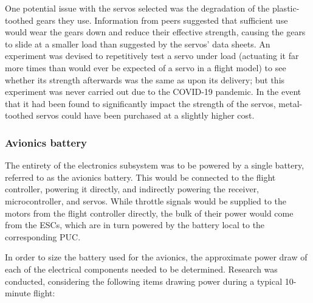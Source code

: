 \documentclass[../../main.tex]{subfiles}
\begin{document}
One potential issue with the servos selected was the degradation of the plastic-toothed gears they use.
Information from peers suggested that sufficient use would wear the gears down and reduce their effective strength, causing the gears to slide at a smaller load than suggested by the servos' data sheets.
An experiment was devised to repetitively test a servo under load (actuating it far more times than would ever be expected of a servo in a flight model) to see whether its strength afterwards was the same as upon its delivery; but this experiment was never carried out due to the COVID-19 pandemic.
In the event that it had been found to significantly impact the strength of the servos, metal-toothed servos could have been purchased at a slightly higher cost. 

\subsubsection{Avionics battery} \label{sec:design-process:revised-design:electronics:avionics-battery}

The entirety of the electronics subsystem was to be powered by a single battery, referred to as the avionics battery.
This would be connected to the flight controller, powering it directly, and indirectly powering the receiver, microcontroller, and servos.
While throttle signals would be supplied to the motors from the flight controller directly, the bulk of their power would come from the ESCs, which are in turn powered by the battery local to the corresponding PUC. 

In order to size the battery used for the avionics, the approximate power draw of each of the electrical components needed to be determined.
Research was conducted, considering the following items drawing power during a typical 10-minute flight: 
\end{document}
